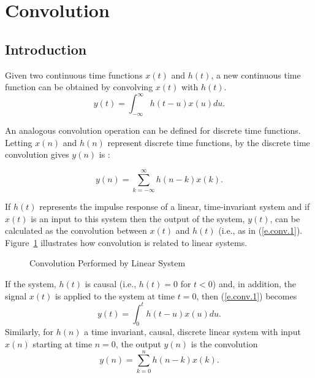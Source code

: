 \section{Convolution}

\subsection{Introduction}

	Given two continuous time functions $x(t)$ and $h(t)$,
a new continuous time function can be obtained by
convolving $x(t)$ with $h(t)$. 
%
\begin{equation}
y(t)=\int_{-\infty}^{\infty}h(t-u)x(u)du.
\label{e.conv.1}
\end{equation}
%

	An analogous convolution operation
can be defined for discrete time functions.  Letting
$x(n)$ and $h(n)$ represent discrete time functions,
by the discrete time convolution gives $y(n)$ is :

%
\begin{equation}
y(n)=\sum_{k=-\infty}^{\infty}h(n-k)x(k).
\label{e.conv.2}
\end{equation}
%

 If $h(t)$ represents the
impulse response of a linear, time-invariant system and if $x(t)$ 
is an input to this system then the output of the system, $y(t)$,
can be calculated as the convolution
between $x(t)$ and $h(t)$ (i.e., as in (\ref{e.conv.1}).
Figure~\ref{f.conv.1} illustrates how convolution is related to 
linear systems.
%
\begin{figure}[tb]
\caption{ Convolution Performed by Linear System}
\label{f.conv.1}
\end{figure}
%
If the system, $h(t)$ is causal (i.e., $h(t)=0$ for $t<0$)
and, in addition, the signal $x(t)$ is applied to the system at
time $t=0$, then (\ref{e.conv.1}) becomes
%
\begin{equation}
y(t)=\int_{0}^{t}h(t-u)x(u)du.
\label{e.conv.3}
\end{equation}
%
Similarly, for $h(n)$ a time invariant, causal, discrete linear
system
with input $x(n)$ starting at time $n=0$, 
the output $y(n)$ is the convolution
%
\begin{equation}
y(n)=\sum_{k=0}^{n}h(n-k)x(k).
\label{e.conv.4}
\end{equation}
%

